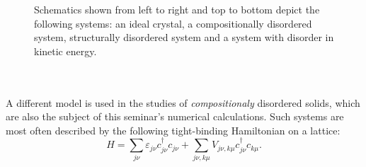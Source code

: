 \documentclass[10pt,a4paper]{article}
\begin{document}
\begin{minipage}[t]{0.38\textwidth}
\begin{figure}[H]
\caption{Schematics shown from left to right and top to bottom depict the following systems: an ideal crystal, a compositionally disordered system, structurally disordered system and a system with disorder in kinetic energy.  }
\label{fig:disorder} 
\end{figure}
\end{minipage} \\\\
\noindent A different model is used in the studies of \emph{compositionaly} disordered solids, which are also the subject of this seminar's numerical calculations. Such systems are most often described by the following tight-binding Hamiltonian on a lattice:
\begin{equation}\label{eq:compositional}
H=\sum\limits_{j\nu}\varepsilon_{j\nu} c^\dagger_{j\nu}c_{j\nu} + \sum\limits_{j\nu,k\mu} V_{j\nu, k\mu}c^\dagger_{j\nu}c_{k\mu}.
\end{equation}
\end{document}

